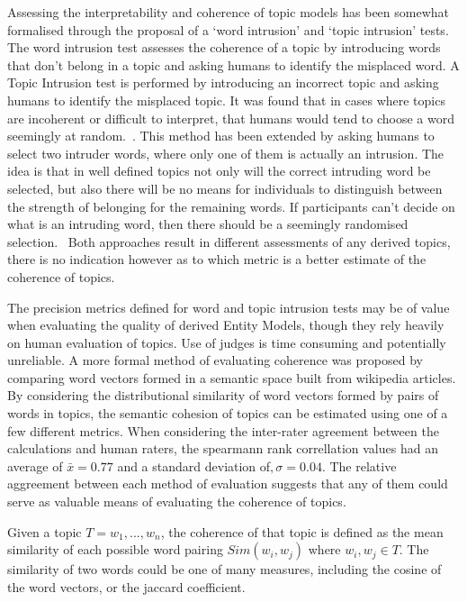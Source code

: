 \documentclass[10pt]{report}
\begin{document}
Assessing the interpretability and coherence of topic models has been somewhat formalised through the proposal of a ‘word intrusion’ and ‘topic intrusion’ tests. The word intrusion test assesses the coherence of a topic by introducing words that don’t belong in a topic and asking humans to identify the misplaced word. A Topic Intrusion test is performed by introducing an incorrect topic and asking humans to identify the misplaced topic. It was found that in cases where topics are incoherent or difficult to interpret, that humans would tend to choose a word seemingly at random.~\cite{Chang2009-jr}. This method has been extended by asking humans to select two intruder words, where only one of them is actually an intrusion. The idea is that in well defined topics not only will the correct intruding word be selected, but also there will be no means for individuals to distinguish between the strength of belonging for the remaining words. If participants can't decide on what is an intruding word, then there should be a seemingly randomised selection.~\cite{Morstatter2016-co} Both approaches result in different assessments of any derived topics, there is no indication however as to which metric is a better estimate of the coherence of topics.

The precision metrics defined for word and topic intrusion tests may be of value when evaluating the quality of derived Entity Models, though they rely heavily on human evaluation of topics. Use of judges is time consuming and potentially unreliable. A more formal method of evaluating coherence was proposed by comparing word vectors formed in a semantic space built from wikipedia articles. By considering the distributional similarity of word vectors formed by pairs of words in topics, the semantic cohesion of topics can be estimated using one of a few different metrics. When considering the inter-rater agreement between the calculations and human raters, the spearmann rank correllation values had an average of  \(\bar{x}=0.77\) and a standard deviation of\(,\sigma=0.04\). The relative aggreement between each method of evaluation suggests that any of them could serve as valuable means of evaluating the coherence of topics. ~\cite{Aletras2013-oo}

Given a topic \(T = {w_1,...,w_n}\), the coherence of that topic is defined as the mean similarity of each possible word pairing \(Sim(w_i, w_j)\) where \(w_i, w_j \in T\). The similarity of two words could be one of many measures, including the cosine of the word vectors, or the jaccard coefficient.~\cite{Newman2010-op}
\end{document}
